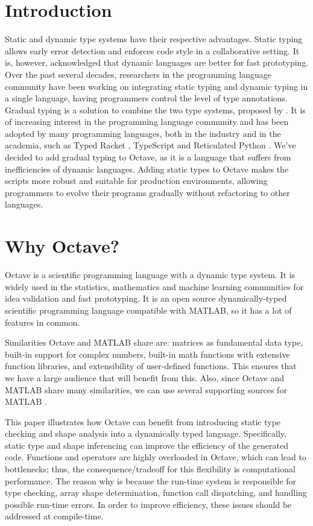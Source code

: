 \section{Introduction}
Static and dynamic type systems have their respective advantages. Static typing allows early error detection and enforces code style in a collaborative setting. It is, however, acknowledged that dynamic languages are better for fast prototyping. Over the past several decades, researchers in the programming language community have been working on integrating static typing and dynamic typing in a single language, having programmers control the level of type annotations. Gradual typing is a solution to combine the two type systems, proposed by \cite{siek2006gradual}. It is of increasing interest in the programming language community and has been adopted by many programming languages, both in the industry and in the academia, such as Typed Racket \cite{tobin2006interlanguage}, TypeScript \cite{bierman2014understanding} and Reticulated Python \cite{vitousek2014design}. We’ve decided to add gradual typing to Octave, as it is a language that suffers from inefficiencies of dynamic languages. Adding static types to Octave makes the scripts more robust and suitable for production environments, allowing programmers to evolve their programs gradually without refactoring to other languages.

\section{Why Octave?}
Octave is a scientific programming language with a dynamic type system. It is widely used in the statistics, mathematics and machine learning communities for idea validation and fast prototyping. It is an open source dynamically-typed scientific programming language compatible with MATLAB, so it has a lot of features in common.

Similarities Octave and MATLAB share are: matrices as fundamental data type, built-in support for complex numbers, built-in math functions with extensive function libraries, and extensibility of user-defined functions. This ensures that we have a large audience that will benefit from this. Also, since Octave and MATLAB share many similarities, we can use several supporting sources for MATLAB \cite{wikibooks}.

This paper \cite{olmos2003turning} illustrates how Octave can benefit from introducing static type checking and shape analysis into a dynamically typed language. Specifically, static type and shape inferencing can improve the efficiency of the generated code. Functions and operators are highly overloaded in Octave, which can lead to bottlenecks; thus, the consequence/tradeoff for this flexibility is computational performance. The reason why is because the run-time system is responsible for type checking, array shape determination, function call dispatching, and handling possible run-time errors. In order to improve efficiency, these issues should be addressed at compile-time.

